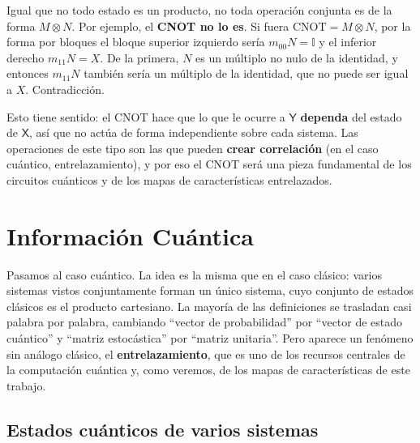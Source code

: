 \documentclass[11pt, a4paper, twoside, openright]{report}
\begin{document}
\begin{tcolorbox}[colback=blue!5!white,colframe=blue!75!black,title=\textbf{Nota Aclaratoria: No toda operación es un producto tensorial}]
Igual que no todo estado es un producto, no toda operación conjunta es de la forma $M\otimes N$. Por ejemplo, el \textbf{CNOT no lo es}. Si fuera $\mathrm{CNOT} = M\otimes N$, por la forma por bloques el bloque superior izquierdo sería $m_{00}N = \mathbb{I}$ y el inferior derecho $m_{11}N = X$. De la primera, $N$ es un múltiplo no nulo de la identidad, y entonces $m_{11}N$ también sería un múltiplo de la identidad, que no puede ser igual a $X$. Contradicción.

Esto tiene sentido: el CNOT hace que lo que le ocurre a $\mathsf{Y}$ \textbf{dependa} del estado de $\mathsf{X}$, así que no actúa de forma independiente sobre cada sistema. Las operaciones de este tipo son las que pueden \textbf{crear correlación} (en el caso cuántico, entrelazamiento), y por eso el CNOT será una pieza fundamental de los circuitos cuánticos y de los mapas de características entrelazados.
\end{tcolorbox}

\cleardoublepage
\section{Información Cuántica}

\noindent Pasamos al caso cuántico. La idea es la misma que en el caso clásico: varios sistemas vistos conjuntamente forman un único sistema, cuyo conjunto de estados clásicos es el producto cartesiano. La mayoría de las definiciones se trasladan casi palabra por palabra, cambiando ``vector de probabilidad'' por ``vector de estado cuántico'' y ``matriz estocástica'' por ``matriz unitaria''. Pero aparece un fenómeno sin análogo clásico, el \textbf{entrelazamiento}, que es uno de los recursos centrales de la computación cuántica y, como veremos, de los mapas de características de este trabajo.

\subsection{Estados cuánticos de varios sistemas}
\end{document}

